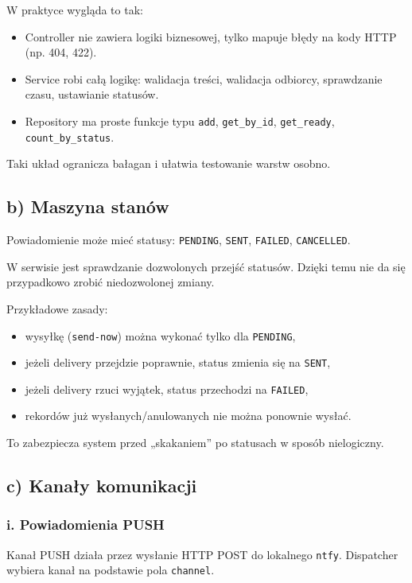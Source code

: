 \documentclass[a4paper,12pt]{article}
\begin{document}
W praktyce wygląda to tak:
\begin{itemize}[leftmargin=1.5em]
    \item Controller nie zawiera logiki biznesowej, tylko mapuje błędy na kody HTTP (np. 404, 422).
    \item Service robi całą logikę: walidacja treści, walidacja odbiorcy, sprawdzanie czasu, ustawianie statusów.
    \item Repository ma proste funkcje typu \texttt{add}, \texttt{get\_by\_id}, \texttt{get\_ready}, \texttt{count\_by\_status}.
\end{itemize}

Taki układ ogranicza bałagan i ułatwia testowanie warstw osobno.

\subsection*{b) Maszyna stanów}

Powiadomienie może mieć statusy: \texttt{PENDING}, \texttt{SENT}, \texttt{FAILED}, \texttt{CANCELLED}.

W serwisie jest sprawdzanie dozwolonych przejść statusów. Dzięki temu nie da się przypadkowo zrobić niedozwolonej zmiany.

Przykładowe zasady:
\begin{itemize}[leftmargin=1.5em]
    \item wysyłkę (\texttt{send-now}) można wykonać tylko dla \texttt{PENDING},
    \item jeżeli delivery przejdzie poprawnie, status zmienia się na \texttt{SENT},
    \item jeżeli delivery rzuci wyjątek, status przechodzi na \texttt{FAILED},
    \item rekordów już wysłanych/anulowanych nie można ponownie wysłać.
\end{itemize}

To zabezpiecza system przed „skakaniem” po statusach w sposób nielogiczny.

\subsection*{c) Kanały komunikacji}

\subsubsection*{i. Powiadomienia PUSH}

Kanał PUSH działa przez wysłanie HTTP POST do lokalnego \texttt{ntfy}. Dispatcher wybiera kanał na podstawie pola \texttt{channel}.
\end{document}
